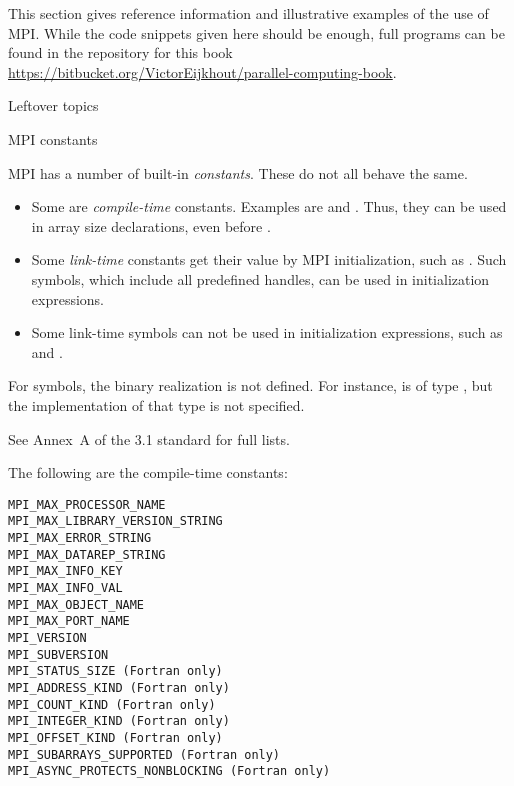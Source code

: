 
This section gives reference information and illustrative examples
of the use of MPI. While the code snippets given here should be enough,
full programs can be found in the repository for this book
\url{https://bitbucket.org/VictorEijkhout/parallel-computing-book}.

 {Leftover topics}

 {MPI constants}

MPI has a number of built-in \emph{constants}. These do not all behave
the same.
\begin{itemize}
\item Some are \emph{compile-time}
  constants. Examples are  and
  . Thus, they can be used in
  array size declarations, even before .
\item Some \emph{link-time}
  constants get their value by MPI initialization, such as
  . Such symbols, which include all
  predefined handles, can be used in initialization expressions.
\item Some link-time symbols can not be used in initialization
  expressions, such as  and .
\end{itemize}

For symbols, the binary realization is not defined. For instance,
 is of type , but
the implementation of that type is not specified.

See Annex~A of the 3.1 standard for full lists.

The following are the compile-time constants:
\begin{lstlisting}
MPI_MAX_PROCESSOR_NAME
MPI_MAX_LIBRARY_VERSION_STRING
MPI_MAX_ERROR_STRING
MPI_MAX_DATAREP_STRING
MPI_MAX_INFO_KEY
MPI_MAX_INFO_VAL
MPI_MAX_OBJECT_NAME
MPI_MAX_PORT_NAME
MPI_VERSION
MPI_SUBVERSION
MPI_STATUS_SIZE (Fortran only)
MPI_ADDRESS_KIND (Fortran only)
MPI_COUNT_KIND (Fortran only)
MPI_INTEGER_KIND (Fortran only)
MPI_OFFSET_KIND (Fortran only)
MPI_SUBARRAYS_SUPPORTED (Fortran only)
MPI_ASYNC_PROTECTS_NONBLOCKING (Fortran only)
\end{lstlisting}


